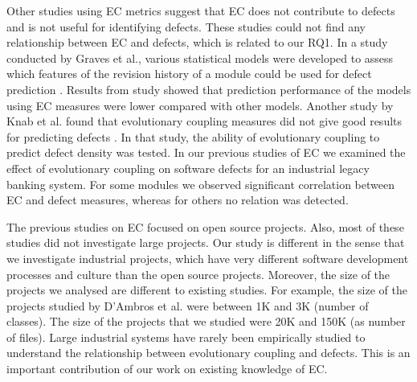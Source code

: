 \documentclass[times]{smrauth}
\begin{document}
Other studies using EC metrics suggest that EC does not contribute to defects and is not useful for identifying defects. These studies could not find any relationship between EC and defects, which is related to our RQ1. In a study conducted by Graves et al., various statistical models were developed to assess which features of the revision history of a module could be used for defect prediction \cite{graves2000predicting}. Results  from study showed that prediction performance of the models using EC measures were lower compared with other models. Another study by Knab et al. found that evolutionary coupling measures did not give good results for predicting defects \cite{knab2006predicting}. In that study, the ability of evolutionary coupling to predict defect density was tested. In our previous studies of EC \cite{Kirbas:2014:EEC:2652524.2652577} \cite{DBLP:conf/uyms/KirbasSCB14} we examined the effect of evolutionary coupling on software defects for an industrial legacy banking system. For some modules we observed significant correlation between EC and defect measures, whereas for others no relation was detected.

The previous studies on EC focused on open source projects. Also, most of these studies did not investigate large projects. Our study is different in the sense that we investigate industrial projects, which have very different software development processes and culture than the open source projects. Moreover, the size of the projects we analysed are different to existing studies. For example, the size of the projects studied by D'Ambros et al. \cite{d2009relationship} were between 1K and 3K (number of classes). The size of the projects that we studied were 20K and 150K (as number of files). Large industrial systems have rarely been empirically studied to understand the relationship between evolutionary coupling and defects. This is an important contribution of our work on existing knowledge of EC. 


\end{document}
